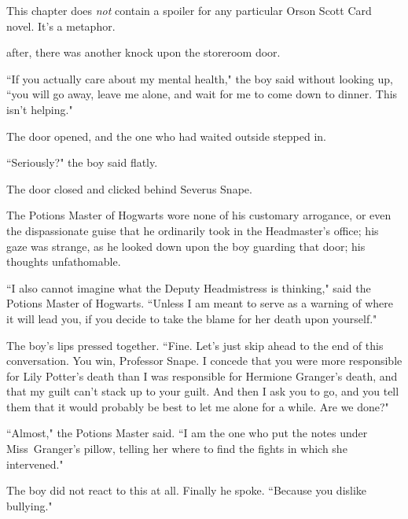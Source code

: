 
\begin{chapterOpeningAuthorNote}
This chapter does \emph{not} contain a spoiler for any particular Orson Scott Card novel. It's a metaphor.
\end{chapterOpeningAuthorNote}

 after, there was another knock upon the storeroom door.

\hplettrineextrapara
``If you actually care about my mental health," the boy said without looking up, ``you will go away, leave me alone, and wait for me to come down to dinner. This isn't helping."

The door opened, and the one who had waited outside stepped in.

``Seriously?" the boy said flatly.

The door closed and clicked behind Severus Snape.

The Potions Master of Hogwarts wore none of his customary arrogance, or even the dispassionate guise that he ordinarily took in the Headmaster's office; his gaze was strange, as he looked down upon the boy guarding that door; his thoughts unfathomable.

``I also cannot imagine what the Deputy Headmistress is thinking," said the Potions Master of Hogwarts. ``Unless I am meant to serve as a warning of where it will lead you, if you decide to take the blame for her death upon yourself."

The boy's lips pressed together. ``Fine. Let's just skip ahead to the end of this conversation. You win, Professor Snape. I concede that you were more responsible for Lily Potter's death than I was responsible for Hermione Granger's death, and that my guilt can't stack up to your guilt. And then I ask you to go, and you tell them that it would probably be best to let me alone for a while. Are we done?"

``Almost," the Potions Master said. ``I am the one who put the notes under Miss~Granger's pillow, telling her where to find the fights in which she intervened."

The boy did not react to this at all. Finally he spoke. ``Because you dislike bullying."

